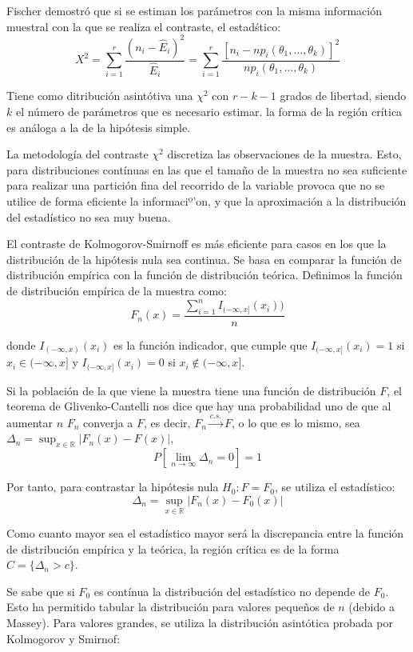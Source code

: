 Fischer demostr\'o que si se estiman los par\'ametros con la misma informaci\'on muestral con la que se realiza el contraste, el estad\'stico:
\[X^2=\sum_{i=1}^r\dfrac{(n_i-\hat{E}_i)^2}{\hat{E}_i}=\sum_{i=1}^r\dfrac{[n_i-np_i(\theta_1,\ldots,\theta_k)]^2}{np_i(\theta_1,\ldots,\theta_k)}\]

Tiene como ditribuci\'on asint\'otiva una $\chi^2$ con $r-k-1$ grados de libertad, siendo $k$ el n\'umero de par\'ametros que es necesario estimar. la forma de la regi\'on cr\'itica es an\'aloga a la de la hip\'otesis simple.


La metodolog\'ia del contraste $\chi^2$ discretiza las observaciones de la muestra. Esto, para distribuciones cont\'inuas en las que el tama\~no de la muestra no sea suficiente para realizar una partici\'on fina del recorrido de la variable provoca que no se utilice de forma eficiente la informaciº'on, y que la aproximaci\'on a la distribuci\'on del estad\'istico no sea muy buena.

El contraste de Kolmogorov-Smirnoff es m\'as eficiente para casos en los que la distribuci\'on de la hip\'otesis nula sea continua. Se basa en comparar la funci\'on de distribuci\'on emp\'irica con la funci\'on de distribuci\'on te\'orica. Definimos la funci\'on de distribuci\'on emp\'irica de la muestra como:
\[F_n(x)=\dfrac{\sum_{i=1}^nI_{(-\infty,x]}(x_i))}{n}\]

donde $I_{(-\infty,x)}(x_i)$ es la funci\'on indicador, que cumple que $I_{(-\infty,x]}(x_i)=1$ si $x_i\in(-\infty,x]$ y $I_{(-\infty,x]}(x_i)=0$ si $x_i\notin(-\infty,x]$.

Si la poblaci\'on de la que viene la muestra tiene una funci\'on de distribuci\'on $F$, el teorema de Glivenko-Cantelli nos dice que hay una probabilidad uno de que al aumentar $n$ $F_n$ converja a $F$, es decir, $F_n\overset{c.s.}{\to}F$, o lo que es lo mismo, sea $\Delta_n=\sup_{x\in\mathbb{R}}|F_n(x)-F(x)|$,
\[P\left[\lim_{n\to\infty}\Delta_n=0\right]=1\]

Por tanto, para contrastar la hip\'otesis nula $H_0:F=F_0$, se utiliza el estad\'istico:
\[\Delta_n=\sup_{x\in\mathbb{R}}|F_n(x)-F_0(x)|\]

Como cuanto mayor sea el estad\'istico mayor ser\'a la discrepancia entre la funci\'on de distribuci\'on emp\'irica y la te\'orica, la regi\'on cr\'itica es de la forma $C=\{\Delta_n>c\}$.

Se sabe que si $F_0$ es cont\'inua la distribuci\'on del estad\'istico no depende de $F_0$. Esto ha permitido tabular la distribuci\'on para valores peque\~nos de $n$ (debido a Massey). Para valores grandes, se utiliza la distribuci\'on asint\'otica probada por Kolmogorov y Smirnof:

